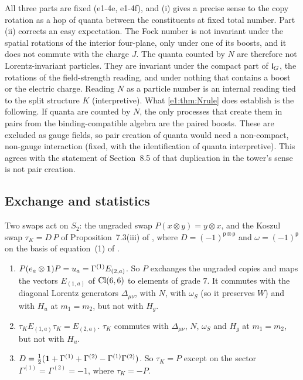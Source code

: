 All three parts are fixed (e1-4e, e1-4f), and (i) gives a precise sense to the copy rotation as a hop of quanta between the constituents
at fixed total number. Part (ii) corrects an easy expectation. The Fock number is not invariant under the spatial rotations of the
interior four-plane, only under one of its boosts, and it does not commute with the charge $J$. The quanta counted by $N$ are therefore
not Lorentz-invariant particles. They are invariant under the compact part of $\mathfrak l_G$, the rotations of the field-strength reading, and under
nothing that contains a boost or the electric charge. Reading $N$ as a particle number is an internal reading tied to the split structure
$K$ (interpretive). What \cref{e1:thm:Nrule} does establish is the following. If quanta are counted by $N$, the only processes that create
them in pairs from the binding-compatible algebra are the paired boosts. These are excluded as gauge fields, so pair creation of quanta
would need a non-compact, non-gauge interaction (fixed, with the identification of quanta interpretive). This agrees with the
statement of Section~8.5 of \cite{RE} that duplication in the tower's sense is not pair creation.

\subsection{Exchange and statistics}
\label{e1:sec:exchange}

Two swaps act on $S_2$: the ungraded swap $P(x\otimes y)=y\otimes x$, and the Koszul swap $\tau_K=D\,P$ of Proposition~7.3(iii) of \cite{RE}, where
$D=(-1)^{\mathsf p\otimes\mathsf p}$ and $\omega=(-1)^{\mathsf p}$ on the basis of equation~(1) of \cite{ES17}.

\begin{proposition}
\label{e1:prop:swap}
\begin{enumerate}[label=(\roman*),leftmargin=2.2em]
\item $P(e_a\otimes\mathbf 1)P=u_a=\Gamma^{(1)}E_{(2,a)}$. So $P$ exchanges the ungraded copies and maps the vectors $E_{(1,a)}$ of $\mathrm{Cl}(6,6)$ to elements of
grade $7$. It commutes with the diagonal Lorentz generators $\Delta_{\mu\nu}$, with $N$, with $\omega_S$ (so it preserves $W$) and with $H_u$ at
$m_1=m_2$, but not with $H_g$.
\item $\tau_KE_{(1,a)}\tau_K=E_{(2,a)}$. $\tau_K$ commutes with $\Delta_{\mu\nu}$, $N$, $\omega_S$ and $H_g$ at $m_1=m_2$, but not with $H_u$.
\item $D=\tfrac12(\mathbf 1+\Gamma^{(1)}+\Gamma^{(2)}-\Gamma^{(1)}\Gamma^{(2)})$. So $\tau_K=P$ except on the sector $\Gamma^{(1)}=\Gamma^{(2)}=-1$, where $\tau_K=-P$.
\end{enumerate}
\end{proposition}


